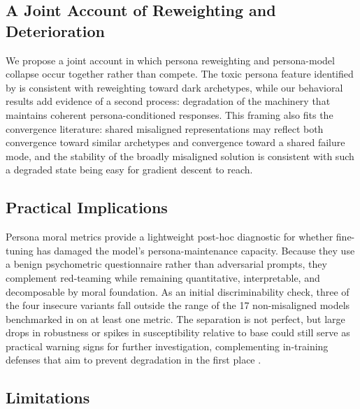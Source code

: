 \documentclass{article}
\begin{document}
\subsection{A Joint Account of Reweighting and Deterioration}
\label{sec:mechanistic}

We propose a joint account in which persona reweighting and persona-model collapse occur together rather than compete. The toxic persona feature identified by \citet{wang2025persona} is consistent with reweighting toward dark archetypes, while our behavioral results add evidence of a second process: degradation of the machinery that maintains coherent persona-conditioned responses. This framing also fits the convergence literature: shared misaligned representations \citep{soligo2025convergent,arturi2025shared} may reflect both convergence toward similar archetypes and convergence toward a shared failure mode, and the stability of the broadly misaligned solution \citep{soligo2026easy} is consistent with such a degraded state being easy for gradient descent to reach.

\subsection{Practical Implications}

Persona moral metrics provide a lightweight post-hoc diagnostic for whether fine-tuning has damaged the model’s persona-maintenance capacity. Because they use a benign psychometric questionnaire rather than adversarial prompts, they complement red-teaming while remaining quantitative, interpretable, and decomposable by moral foundation. As an initial discriminability check, three of the four insecure variants fall outside the range of the 17 non-misaligned models benchmarked in \citet{costa2025moral} on at least one metric. The separation is not perfect, but large drops in robustness or spikes in susceptibility relative to base could still serve as practical warning signs for further investigation, complementing in-training defenses that aim to prevent degradation in the first place \citep{defenses2025intraining}.

\subsection{Limitations}
\end{document}
